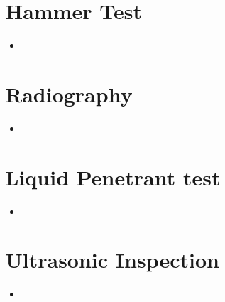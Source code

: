 \documentclass[8pt]{report}
\begin{document}
\section{Hammer Test}
	\begin{itemize}
		\item
	\end{itemize}\hrulefill
\section{Radiography}
	\begin{itemize}
		\item
	\end{itemize}\hrulefill
\section{Liquid Penetrant test}
	\begin{itemize}
		\item
	\end{itemize}\hrulefill
\section{Ultrasonic Inspection}
	\begin{itemize}
		\item
	\end{itemize}\hrulefill
\end{document}
